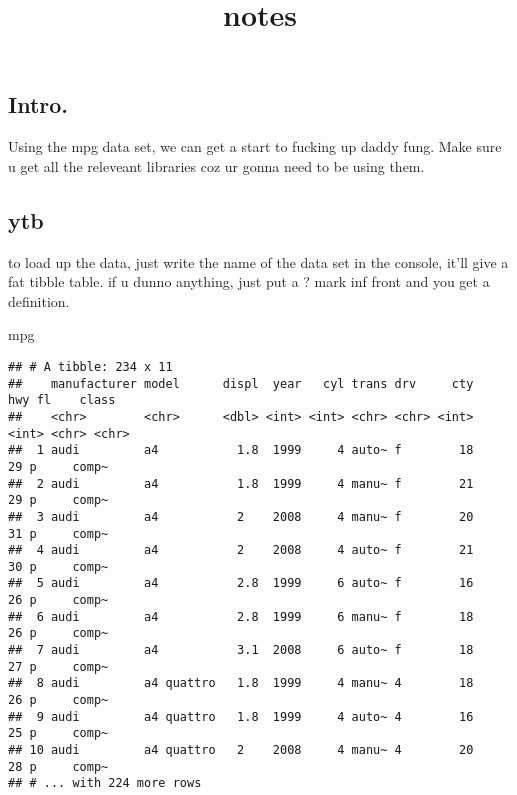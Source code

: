 \documentclass[
]{article}
\title{notes}
\author{}
\date{\vspace{-2.5em}}
\newenvironment{Shaded}{\begin{snugshade}}{\end{snugshade}}
\newcommand{\NormalTok}[1]{#1}
\begin{document}
\maketitle

\hypertarget{intro.}{%
\subsection{Intro.}\label{intro.}}

Using the mpg data set, we can get a start to fucking up daddy fung.
Make sure u get all the releveant libraries coz ur gonna need to be
using them.

\hypertarget{ytb}{%
\subsection{ytb}\label{ytb}}

to load up the data, just write the name of the data set in the console,
it'll give a fat tibble table. if u dunno anything, just put a ? mark
inf front and you get a definition.

\begin{Shaded}
\begin{Highlighting}[]
\NormalTok{mpg}
\end{Highlighting}
\end{Shaded}

\begin{verbatim}
## # A tibble: 234 x 11
##    manufacturer model      displ  year   cyl trans drv     cty   hwy fl    class
##    <chr>        <chr>      <dbl> <int> <int> <chr> <chr> <int> <int> <chr> <chr>
##  1 audi         a4           1.8  1999     4 auto~ f        18    29 p     comp~
##  2 audi         a4           1.8  1999     4 manu~ f        21    29 p     comp~
##  3 audi         a4           2    2008     4 manu~ f        20    31 p     comp~
##  4 audi         a4           2    2008     4 auto~ f        21    30 p     comp~
##  5 audi         a4           2.8  1999     6 auto~ f        16    26 p     comp~
##  6 audi         a4           2.8  1999     6 manu~ f        18    26 p     comp~
##  7 audi         a4           3.1  2008     6 auto~ f        18    27 p     comp~
##  8 audi         a4 quattro   1.8  1999     4 manu~ 4        18    26 p     comp~
##  9 audi         a4 quattro   1.8  1999     4 auto~ 4        16    25 p     comp~
## 10 audi         a4 quattro   2    2008     4 manu~ 4        20    28 p     comp~
## # ... with 224 more rows
\end{verbatim}
\end{document}
